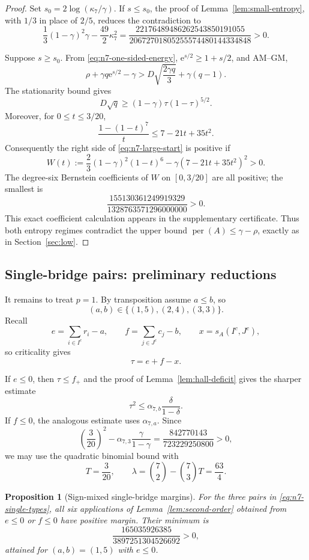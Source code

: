 \documentclass[11pt]{article}
\newtheorem{proposition}[theorem]{Proposition}
\theoremstyle{definition}
\newcommand{\per}{\operatorname{per}}
\newcommand{\1}{\mathbf{1}}
\newcommand{\e}{\mathrm{e}}
\begin{document}
\begin{proof}
Set $s_0=2\log(\kappa_7/\gamma)$.  If $s\le s_0$, the proof of
Lemma~\ref{lem:small-entropy}, with $1/3$ in place of $2/5$, reduces the
contradiction to
\[
 \frac13(1-\gamma)^2\gamma-\frac{49}{2}\kappa_7^2
 =
 \frac{22176489486262543850191055}
 {20672701805255574480144334848}>0.
 \tag{8.10}\label{eq:n7-small-entropy-certificate}
\]

Suppose $s\ge s_0$.  From \eqref{eq:n7-one-sided-energy},
$\e^{s/2}\ge1+s/2$, and AM--GM,
\[
 \rho+\gamma q\e^{s/2}-\gamma
 >D\sqrt{\frac{2\gamma q}{3}}+\gamma(q-1).
 \tag{8.11}\label{eq:n7-large-start}
\]
The stationarity bound gives
\[
 D\sqrt q\ge
 (1-\gamma)\tau(1-\tau)^{5/2}.
\]
Moreover, for $0\le t\le3/20$,
\[
 \frac{1-(1-t)^7}{t}
 \le7-21t+35t^2.
\]
Consequently the right side of \eqref{eq:n7-large-start} is positive if
\[
 W(t):=\frac23(1-\gamma)^2(1-t)^6
       -\gamma(7-21t+35t^2)^2>0.
 \tag{8.12}\label{eq:n7-large-polynomial}
\]
The degree-six Bernstein coefficients of $W$ on $[0,3/20]$ are all positive;
the smallest is
\[
 \frac{155130361249919329}{1328763571296000000}>0.
 \tag{8.13}\label{eq:n7-large-bernstein-min}
\]
This exact coefficient calculation appears in the supplementary certificate.
Thus both entropy regimes contradict the upper bound
$\per(A)\le\gamma-\rho$, exactly as in Section~\ref{sec:low}.
\end{proof}

\subsection{Single-bridge pairs: preliminary reductions}

It remains to treat $p=1$.  By transposition assume $a\le b$, so
\[
 (a,b)\in\{(1,5),(2,4),(3,3)\}.
 \tag{8.14}\label{eq:n7-single-types}
\]
Recall
\[
 e=\sum_{i\in I^c}r_i-a,
 \qquad
 f=\sum_{j\in J^c}c_j-b,
 \qquad
 x=s_A(I^c,J^c),
\]
so criticality gives
\[
 \tau=e+f-x.
 \tag{8.15}\label{eq:n7-tau-efx}
\]

If $e\le0$, then $\tau\le f_+$ and the proof of
Lemma~\ref{lem:hall-deficit} gives the sharper estimate
\[
 \tau^2\le\alpha_{7,b}\frac{\delta}{1-\delta}.
\]
If $f\le0$, the analogous estimate uses $\alpha_{7,a}$.  Since
\[
 \left(\frac3{20}\right)^2
 -\alpha_{7,3}\frac{\gamma}{1-\gamma}
 =\frac{842770143}{723229250800}>0,
 \tag{8.16}\label{eq:n7-mixed-range}
\]
we may use the quadratic binomial bound with
\[
 T=\frac3{20},
 \qquad
 \lambda=\binom72-\binom73T=\frac{63}{4}.
\]

\begin{proposition}[Sign-mixed single-bridge margins]
\label{prop:n7-sign-mixed}
For the three pairs in \eqref{eq:n7-single-types}, all six applications of
Lemma~\ref{lem:second-order} obtained from $e\le0$ or $f\le0$ have positive
margin.  Their minimum is
\[
 \frac{165035926385}{3897251304526692}>0,
 \tag{8.17}\label{eq:n7-mixed-minimum}
\]
attained for $(a,b)=(1,5)$ with $e\le0$.
\end{proposition}
\end{document}
